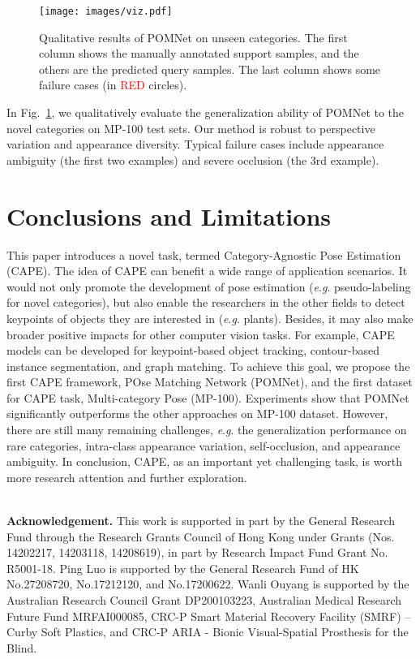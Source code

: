 \documentclass[runningheads]{llncs}
\newcommand{\eg}{\textit{e}.\textit{g}. }
\begin{document}
\begin{figure}[t]
	\centering
	\texttt{[image: images/viz.pdf]}
	\caption{Qualitative results of POMNet on unseen categories. The first column shows the manually annotated support samples, and the others are the predicted query samples. The last column shows some failure cases (in \textcolor{red}{RED} circles).
	}
	\label{fig:viz}
\end{figure}

In Fig.~\ref{fig:viz}, we qualitatively evaluate the generalization ability of POMNet to the novel categories on MP-100 test sets. Our method is robust to perspective variation and appearance diversity. Typical failure cases include appearance ambiguity (the first two examples) and severe occlusion (the 3rd example).

\section{Conclusions and Limitations}

This paper introduces a novel task, termed Category-Agnostic Pose Estimation (CAPE). The idea of CAPE can benefit a wide range of application scenarios. It would not only promote the development of pose estimation (\eg pseudo-labeling for novel categories), but also enable the researchers in the other fields to detect keypoints of objects they are interested in (\eg plants). Besides, it may also make broader positive impacts for other computer vision tasks. For example, CAPE models can be developed for keypoint-based object tracking, contour-based instance segmentation, and graph matching. To achieve this goal, we propose the first CAPE framework, POse Matching Network (POMNet), and the first dataset for CAPE task, Multi-category Pose (MP-100). Experiments show that POMNet significantly outperforms the other approaches on MP-100 dataset. 
However, there are still many remaining challenges, \eg the generalization performance on rare categories, intra-class appearance variation, self-occlusion, and appearance ambiguity.
In conclusion, CAPE, as an important yet challenging task, is worth more research attention and further exploration.

~\\
\textbf{Acknowledgement.} 
This work is supported in part by the General Research Fund through the Research Grants Council of Hong Kong under Grants (Nos. 14202217, 14203118, 14208619), in part by Research Impact Fund Grant No. R5001-18.
Ping Luo is supported by the General Research Fund of HK No.27208720, No.17212120, and No.17200622.
Wanli Ouyang is supported by the Australian Research Council Grant DP200103223, Australian Medical Research Future Fund MRFAI000085, CRC-P Smart Material Recovery Facility (SMRF) – Curby Soft Plastics, and CRC-P ARIA - Bionic Visual-Spatial Prosthesis for the Blind.

\clearpage


\end{document}
